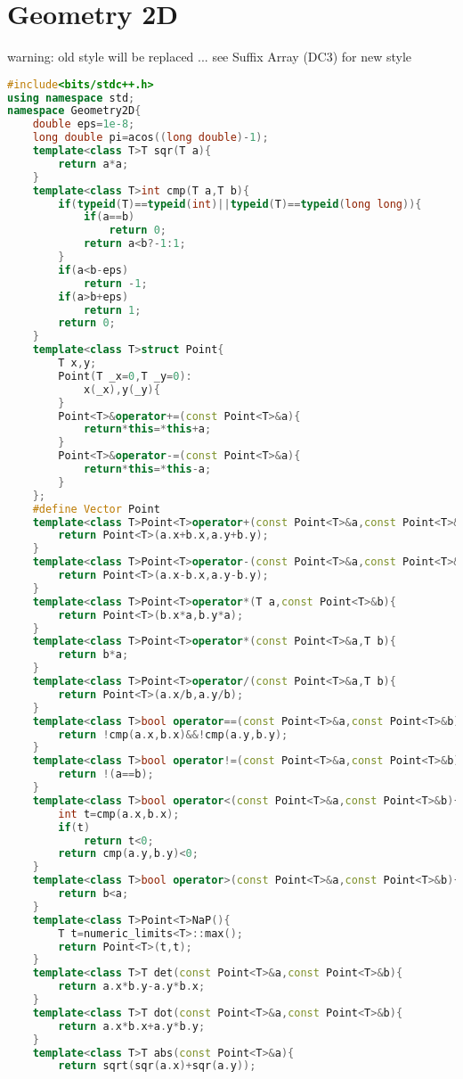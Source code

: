 \documentclass{book}
\begin{document}
\section{Geometry 2D}
warning: old style will be replaced ... see Suffix Array (DC3) for new style\begin{lstlisting}[language=C++,title={Geometry 2D.hpp (5031 bytes, 159 lines)}]
#include<bits/stdc++.h>
using namespace std;
namespace Geometry2D{
    double eps=1e-8;
    long double pi=acos((long double)-1);
    template<class T>T sqr(T a){
        return a*a;
    }
    template<class T>int cmp(T a,T b){
        if(typeid(T)==typeid(int)||typeid(T)==typeid(long long)){
            if(a==b)
                return 0;
            return a<b?-1:1;
        }
        if(a<b-eps)
            return -1;
        if(a>b+eps)
            return 1;
        return 0;
    }
    template<class T>struct Point{
        T x,y;
        Point(T _x=0,T _y=0):
            x(_x),y(_y){
        }
        Point<T>&operator+=(const Point<T>&a){
            return*this=*this+a;
        }
        Point<T>&operator-=(const Point<T>&a){
            return*this=*this-a;
        }
    };
    #define Vector Point
    template<class T>Point<T>operator+(const Point<T>&a,const Point<T>&b){
        return Point<T>(a.x+b.x,a.y+b.y);
    }
    template<class T>Point<T>operator-(const Point<T>&a,const Point<T>&b){
        return Point<T>(a.x-b.x,a.y-b.y);
    }
    template<class T>Point<T>operator*(T a,const Point<T>&b){
        return Point<T>(b.x*a,b.y*a);
    }
    template<class T>Point<T>operator*(const Point<T>&a,T b){
        return b*a;
    }
    template<class T>Point<T>operator/(const Point<T>&a,T b){
        return Point<T>(a.x/b,a.y/b);
    }
    template<class T>bool operator==(const Point<T>&a,const Point<T>&b){
        return !cmp(a.x,b.x)&&!cmp(a.y,b.y);
    }
    template<class T>bool operator!=(const Point<T>&a,const Point<T>&b){
        return !(a==b);
    }
    template<class T>bool operator<(const Point<T>&a,const Point<T>&b){
        int t=cmp(a.x,b.x);
        if(t)
            return t<0;
        return cmp(a.y,b.y)<0;
    }
    template<class T>bool operator>(const Point<T>&a,const Point<T>&b){
        return b<a;
    }
    template<class T>Point<T>NaP(){
        T t=numeric_limits<T>::max();
        return Point<T>(t,t);
    }
    template<class T>T det(const Point<T>&a,const Point<T>&b){
        return a.x*b.y-a.y*b.x;
    }
    template<class T>T dot(const Point<T>&a,const Point<T>&b){
        return a.x*b.x+a.y*b.y;
    }
    template<class T>T abs(const Point<T>&a){
        return sqrt(sqr(a.x)+sqr(a.y));

\end{lstlisting}
\end{document}

